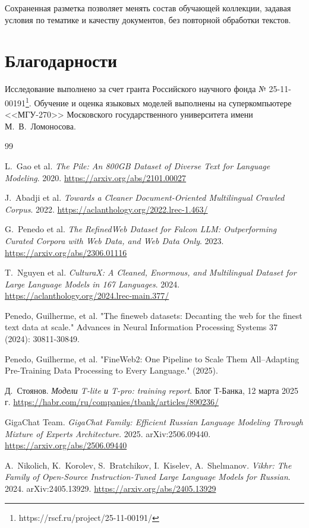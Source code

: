 \documentclass[12pt,a4paper]{article}
\begin{document}
Сохраненная разметка позволяет менять состав обучающей коллекции, 
задавая условия по тематике и качеству документов, без повторной обработки текстов.

\section*{Благодарности}
Исследование выполнено за счет гранта Российского научного фонда № 25-11-00191\footnote{https://rscf.ru/project/25-11-00191/}.
Обучение и оценка языковых моделей выполнены на суперкомпьютере <<МГУ-270>>
Московского государственного университета имени М.~В.~Ломоносова.

\newpage

\begin{thebibliography}{99}

L.~Gao et al.
\textit{The Pile: An 800GB Dataset of Diverse Text for Language Modeling}.
2020.
\url{https://arxiv.org/abs/2101.00027}

J.~Abadji et al.
\textit{Towards a Cleaner Document-Oriented Multilingual Crawled Corpus}.
2022.
\url{https://aclanthology.org/2022.lrec-1.463/}

G.~Penedo et al.
\textit{The RefinedWeb Dataset for Falcon LLM: Outperforming Curated Corpora with Web Data, and Web Data Only}.
2023.
\url{https://arxiv.org/abs/2306.01116}

T.~Nguyen et al.
\textit{CulturaX: A Cleaned, Enormous, and Multilingual Dataset for Large Language Models in 167 Languages}.
2024.
\url{https://aclanthology.org/2024.lrec-main.377/}

Penedo, Guilherme, et al. "The fineweb datasets: Decanting the web for the finest text data at scale." Advances in Neural Information Processing Systems 37 (2024): 30811-30849.

Penedo, Guilherme, et al. "FineWeb2: One Pipeline to Scale Them All--Adapting Pre-Training Data Processing to Every Language." (2025).

Д.~Стоянов.
\textit{Модели T-lite и T-pro: training report}.
Блог Т-Банка, 12 марта 2025 г.
\url{https://habr.com/ru/companies/tbank/articles/890236/}

GigaChat Team.
\textit{GigaChat Family: Efficient Russian Language Modeling Through Mixture of Experts Architecture}.
2025. arXiv:2506.09440.
\url{https://arxiv.org/abs/2506.09440}

A.~Nikolich, K.~Korolev, S.~Bratchikov, I.~Kiselev, A.~Shelmanov.
\textit{Vikhr: The Family of Open-Source Instruction-Tuned Large Language Models for Russian}.
2024. arXiv:2405.13929.
\url{https://arxiv.org/abs/2405.13929}


\end{thebibliography}
\end{document}
